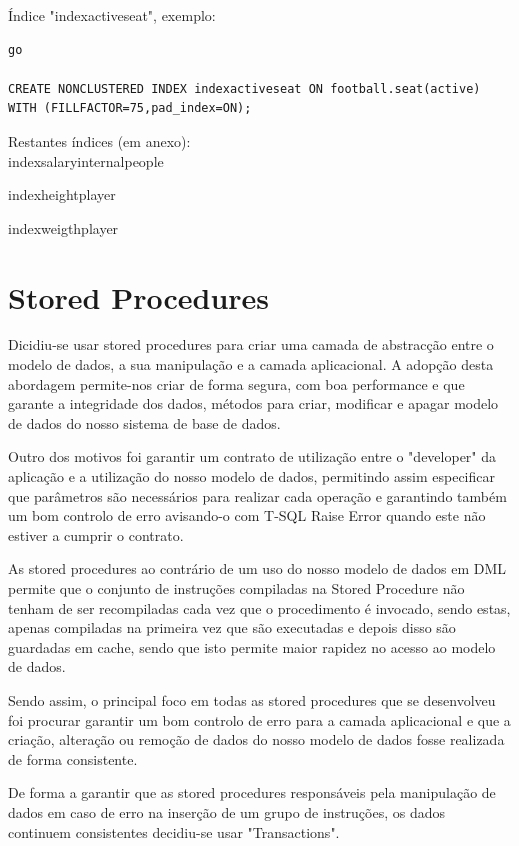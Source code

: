 \documentclass[pdftex,12pt,a4paper]{report}
\begin{document}
Índice "indexactiveseat", exemplo:
\\

\begin{lstlisting}
go

CREATE NONCLUSTERED INDEX indexactiveseat ON football.seat(active)
WITH (FILLFACTOR=75,pad_index=ON);
\end{lstlisting}
 \vspace{0,5in}
Restantes índices (em anexo):
\\

indexsalaryinternalpeople

indexheightplayer

indexweigthplayer

\newpage

\section{Stored Procedures}
Dicidiu-se usar stored procedures para criar uma camada de abstracção entre o modelo de dados, a sua manipulação e a camada aplicacional. A adopção desta abordagem permite-nos criar de forma segura, com boa performance e que garante a integridade dos dados, métodos para criar, modificar e apagar modelo de dados do nosso sistema de base de dados.

Outro dos motivos foi garantir um contrato de utilização entre o "developer" da aplicação e a utilização do nosso modelo de dados, permitindo assim especificar que parâmetros são necessários para realizar cada operação e garantindo também um bom controlo de erro avisando-o com T-SQL Raise Error quando este não estiver a cumprir o contrato.

As stored procedures ao contrário de um uso do nosso modelo de dados em DML permite que o conjunto de instruções compiladas na Stored Procedure  não tenham de ser recompiladas cada vez que o procedimento é invocado, sendo estas, apenas compiladas na primeira vez que são executadas e depois disso são guardadas em cache, sendo que isto permite maior rapidez no acesso ao modelo de dados.

Sendo assim, o principal foco em todas as stored procedures que se desenvolveu foi procurar garantir um bom controlo de erro para a camada aplicacional e que a criação, alteração ou remoção de dados do nosso modelo de dados fosse realizada de forma consistente.

De forma a garantir que as stored procedures responsáveis pela manipulação de dados em caso de erro na inserção de um grupo de instruções, os dados continuem consistentes  decidiu-se usar "Transactions".
\end{document}
